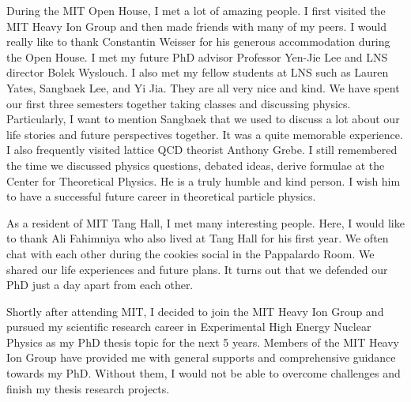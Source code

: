 During the MIT Open House, I met a lot of amazing people. I first visited the MIT Heavy Ion Group and then made friends with many of my peers. I would really like to thank Constantin Weisser for his generous accommodation during the Open House. I met my future PhD advisor Professor Yen-Jie Lee and LNS director Bolek Wyslouch. I also met my fellow students at LNS such as Lauren Yates, Sangbaek Lee, and Yi Jia. They are all very nice and kind. We have spent our first three semesters together taking classes and discussing physics. Particularly, I want to mention Sangbaek that we used to discuss a lot about our life stories and future perspectives together. It was a quite memorable experience. I also frequently visited lattice QCD theorist Anthony Grebe. I still remembered the time we discussed physics questions, debated ideas, derive formulae at the Center for Theoretical Physics. He is a truly humble and kind person. I wish him to have a successful future career in theoretical particle physics.


As a resident of MIT Tang Hall, I met many interesting people. Here, I would like to thank Ali Fahimniya who also lived at Tang Hall for his first year. We often chat with each other during the cookies social in the Pappalardo Room. We shared our life experiences and future plans. It turns out that we defended our PhD just a day apart from each other. 

Shortly after attending MIT, I decided to join the MIT Heavy Ion Group and pursued my scientific research career in Experimental High Energy Nuclear Physics as my PhD thesis topic for the next 5 years. Members of the MIT Heavy Ion Group have provided me with general supports and comprehensive guidance towards my PhD. Without them, I would not be able to overcome challenges and finish my thesis research projects. 


